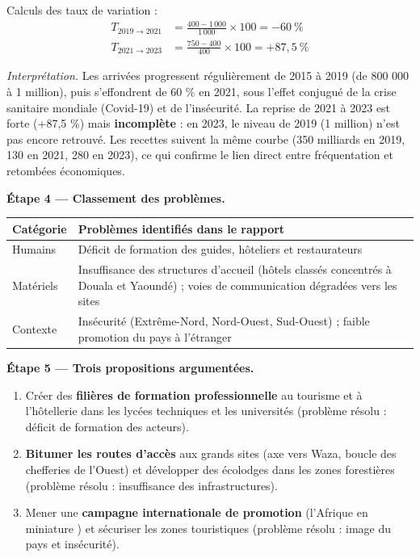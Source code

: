 \documentclass[11pt]{article}
\begin{document}
\begin{exoresolu}
Calculs des taux de variation :
\begin{align*}
T_{2019\rightarrow 2021} &= \frac{400 - 1\,000}{1\,000}\times 100 = -60\ \% \\
T_{2021\rightarrow 2023} &= \frac{750 - 400}{400}\times 100 = +87{,}5\ \%
\end{align*}

\emph{Interprétation.} Les arrivées progressent régulièrement de 2015 à 2019 (de 800 000 à 1 million), puis s'effondrent de 60 \% en 2021, sous l'effet conjugué de la crise sanitaire mondiale (Covid-19) et de l'insécurité. La reprise de 2021 à 2023 est forte (+87,5 \%) mais \textbf{incomplète} : en 2023, le niveau de 2019 (1 million) n'est pas encore retrouvé. Les recettes suivent la même courbe (350 milliards en 2019, 130 en 2021, 280 en 2023), ce qui confirme le lien direct entre fréquentation et retombées économiques.

\textbf{Étape 4 — Classement des problèmes.}

\begin{center}
\begin{tabularx}{\linewidth}{|l|X|}
\hline
\rowcolor{popblueL} \textbf{Catégorie} & \textbf{Problèmes identifiés dans le rapport} \\
\hline Humains & Déficit de formation des guides, hôteliers et restaurateurs \\
\hline Matériels & Insuffisance des structures d'accueil (hôtels classés concentrés à Douala et Yaoundé) ; voies de communication dégradées vers les sites \\
\hline Contexte & Insécurité (Extrême-Nord, Nord-Ouest, Sud-Ouest) ; faible promotion du pays à l'étranger \\
\hline
\end{tabularx}
\end{center}

\textbf{Étape 5 — Trois propositions argumentées.}
\begin{enumerate}
\item Créer des \textbf{filières de formation professionnelle} au tourisme et à l'hôtellerie dans les lycées techniques et les universités (problème résolu : déficit de formation des acteurs).
\item \textbf{Bitumer les routes d'accès} aux grands sites (axe vers Waza, boucle des chefferies de l'Ouest) et développer des écolodges dans les zones forestières (problème résolu : insuffisance des infrastructures).
\item Mener une \textbf{campagne internationale de promotion} (\og l'Afrique en miniature \fg{}) et sécuriser les zones touristiques (problème résolu : image du pays et insécurité).
\end{enumerate}


\end{exoresolu}
\end{document}
